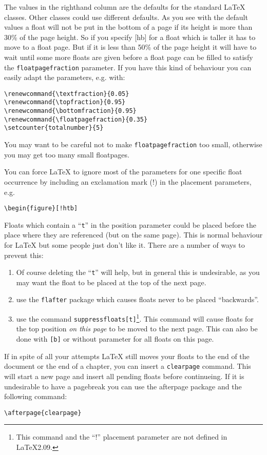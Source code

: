 \documentclass[a4paper]{article}
\def\latex/{\protect\LaTeX{}}
\newcommand{\bs}{\symbol{'134}}
\newcommand{\Cmd}[1]{\texttt{\def\{{\char`\{}\def\}{\char`\}}\bs#1}}
\renewcommand{\topfraction}{0.9}
\renewcommand{\bottomfraction}{0.9}
\renewcommand{\textfraction}{0.05}
\begin{document}
The values in the righthand column are the defaults for the standard
\latex/ classes. Other classes could use different defaults. As you see
with the default values a float will not be put in the bottom of a page if
its height is more than 30\% of the page height. So if you specify [hb] for
a float which is taller it has to move to a float page. But if it is less
than 50\% of the page height it will have to wait until some more floats
are given before a float page can be filled to satisfy the
\Cmd{floatpagefraction} parameter. If you have this kind of behaviour you
can easily adapt the parameters, e.g. with:
\begin{verbatim}
\renewcommand{\textfraction}{0.05}
\renewcommand{\topfraction}{0.95}
\renewcommand{\bottomfraction}{0.95}
\renewcommand{\floatpagefraction}{0.35}
\setcounter{totalnumber}{5}
\end{verbatim}
You may want to be careful not to make \Cmd{floatpagefraction} too small,
otherwise you may get too many small floatpages.

You can force \latex/ to ignore most of the parameters for one specific float
occurrence by
including an exclamation mark (!) in the placement parameters, e.g.
\begin{verbatim}
\begin{figure}[!htb]
\end{verbatim}

Floats which contain a ``\texttt{t}'' in the position parameter could be
placed before the place where they are referenced (but on the same page).
This is normal behaviour for \latex/ but some people just don't like it.
There are a number of ways to prevent this: 
\begin{enumerate}
\item Of course deleting the ``\texttt{t}'' will help, but in general this is
  undesirable, as you may want the float to be placed at the top of the
  next page.
\item use the \texttt{flafter} package which causes floats never to be
  placed ``backwards''.
\item use the command \Cmd{suppressfloats[t]}\footnote{This command and the
    ``!'' placement parameter are not defined in \LaTeX2.09.}.  This
  command will cause floats for the top position \emph{on this page} to be
  moved to the next page. This can also be done with \texttt{[b]} or
  without parameter for all floats on this page.
\end{enumerate}

If in spite of all your attempts \latex/ still moves your floats to the end
of the document or the end of a chapter, you can insert a \Cmd{clearpage}
command. This will start a new page and insert all pending floats before
continueing. If it is undesirable to have a pagebreak you can use the
\textsf{afterpage} package and the following command:
\begin{verbatim}
\afterpage{clearpage}
\end{verbatim}
\end{document}
